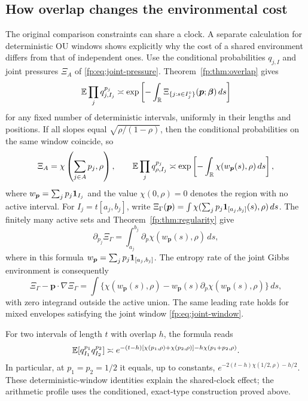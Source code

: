 \subsection{How overlap changes the environmental cost}
The original comparison constraints can share a clock. A separate
calculation for deterministic OU windows shows explicitly why the
cost of a shared environment differs from that of independent ones.
Use the conditional probabilities $q_{j,I}$ and joint pressures
$\Xi_A$ of \eqref{fp:eq:joint-pressure}.
Theorem~\ref{fp:thm:overlap} gives
\[
 \mathbb E\prod_j q_{j,I_j}^{p_j}
 \asymp\exp\left[-\int_\mathbb R
       \Xi_{\{j:s\in I_j^\circ\}}(\boldsymbol p;\boldsymbol\beta)\,ds\right]
\]
for any fixed number of deterministic intervals, uniformly in their
lengths and positions. If all slopes equal $\sqrt{\rho/(1-\rho)}$,
then the conditional probabilities on the same window coincide, so
\begin{equation}\label{fp:eq:overlap-scalar}
 \Xi_A=\chi\left(\sum_{j\in A}p_j,\rho\right),\qquad
 \mathbb E\prod_jq_{\rho,I_j}^{p_j}
 \asymp\exp\left[-\int_\mathbb R\chi(w_{\boldsymbol p}(s),\rho)\,ds\right],
\end{equation}
where $w_{\boldsymbol p}=\sum_jp_j\mathbf 1_{I_j}$ and the value
$\chi(0,\rho)=0$ denotes the region with no active interval.
For $I_j=t[a_j,b_j]$, write
$\Xi_\Gamma(\boldsymbol p)=\int\chi(\sum_jp_j\mathbf 1_{[a_j,b_j]}(s),\rho)\,ds$.
The finitely many active sets and Theorem~\ref{fp:thm:regularity} give
\begin{equation}\label{fp:eq:overlap-derivative}
 \partial_{p_j}\Xi_\Gamma
 =\int_{a_j}^{b_j}\partial_p\chi(w_{\boldsymbol p}(s),\rho)\,ds,
\end{equation}
where in this formula $w_{\boldsymbol p}=\sum_jp_j\mathbf 1_{[a_j,b_j]}$.
The entropy rate of the joint Gibbs environment is consequently
\begin{equation}\label{fp:eq:overlap-entropy}
 \Xi_\Gamma-\boldsymbol p\cdot\nabla\Xi_\Gamma
 =\int\{\chi(w_{\boldsymbol p}(s),\rho)
       -w_{\boldsymbol p}(s)\partial_p\chi(w_{\boldsymbol p}(s),\rho)\}\,ds,
\end{equation}
with zero integrand outside the active union. The same leading rate
holds for mixed envelopes satisfying the joint window
\eqref{fp:eq:joint-window}.

For two intervals of length $t$ with overlap $h$, the formula reads
\begin{equation}\label{fp:eq:overlap-two}
 \mathbb E[q_{I_1}^{p_1}q_{I_2}^{p_2}]
 \asymp e^{-(t-h)[\chi(p_1,\rho)+\chi(p_2,\rho)]
                  -h\chi(p_1+p_2,\rho)}.
\end{equation}
In particular, at $p_1=p_2=1/2$ it equals, up to constants,
$e^{-2(t-h)\chi(1/2,\rho)-h/2}$. These deterministic-window
identities explain the shared-clock effect; the arithmetic profile
uses the conditioned, exact-type construction proved above.
